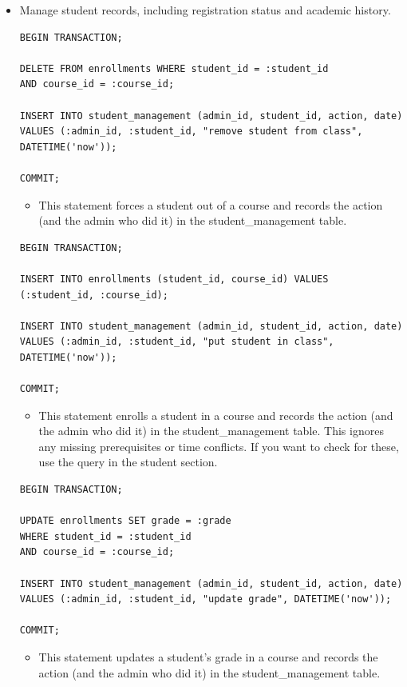 \documentclass{report}
\begin{document}
\begin{itemize}
    \item Manage student records, including registration status and academic history.
    \begin{lstlisting}
BEGIN TRANSACTION;

DELETE FROM enrollments WHERE student_id = :student_id
AND course_id = :course_id;

INSERT INTO student_management (admin_id, student_id, action, date)
VALUES (:admin_id, :student_id, "remove student from class", DATETIME('now'));

COMMIT;
    \end{lstlisting}
    \begin{itemize}
        \item This statement forces a student out of a course and records the action (and the admin who did it) in the student\_management table.
    \end{itemize}
    \begin{lstlisting}
BEGIN TRANSACTION;

INSERT INTO enrollments (student_id, course_id) VALUES (:student_id, :course_id);

INSERT INTO student_management (admin_id, student_id, action, date)
VALUES (:admin_id, :student_id, "put student in class", DATETIME('now'));

COMMIT;
    \end{lstlisting}
    \begin{itemize}
        \item This statement enrolls a student in a course and records the action (and the admin who did it) in the student\_management table. This ignores any missing prerequisites or time conflicts. If you want to check for these, use the query in the student section.
    \end{itemize}
    \begin{lstlisting}
BEGIN TRANSACTION;

UPDATE enrollments SET grade = :grade
WHERE student_id = :student_id
AND course_id = :course_id;

INSERT INTO student_management (admin_id, student_id, action, date)
VALUES (:admin_id, :student_id, "update grade", DATETIME('now'));

COMMIT;
    \end{lstlisting}
    \begin{itemize}
        \item This statement updates a student's grade in a course and records the action (and the admin who did it) in the student\_management table.
    \end{itemize}
    

\end{itemize}
\end{document}
